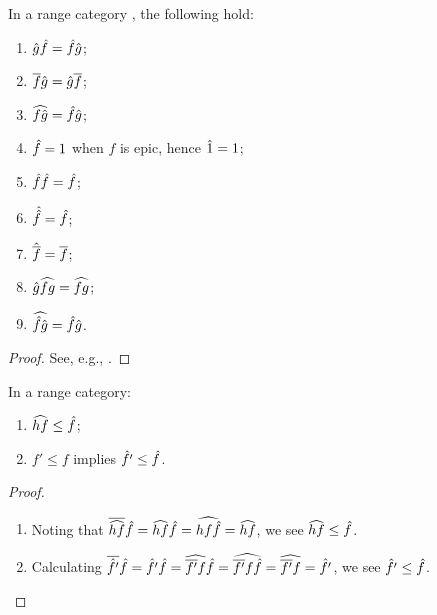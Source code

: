 \begin{lemma}\label{lem:basic_range_category_properties}
  In a range category \X, the following hold:
  \begin{multicols}{2}
    \begin{enumerate}[{(}i{)}]
      \item $\hat{g}\hat{f} = \hat{f}\hat{g}$;
      \item $\overline{f}\hat{g} = \hat{g}\overline{f}$;
      \item $\widehat{f\hat{g}} = \hat{f}\hat{g}$;
      \item $\hat{f} = 1$ when $f$ is epic, hence $\hat{1} = 1$;
      \item $\hat{f}\hat{f} = \hat{f}$;
      \item $\hat{\hat{f}} = \hat{f}$;
      \item $\hat{\overline{f}} = \overline{f}$;
      \item $\hat{g}\widehat{f g} = \widehat{f g}$;
      \item $\widehat{\hat{f}\hat{g}} = \hat{f}\hat{g}$.
    \end{enumerate}
  \end{multicols}
\end{lemma}
\begin{proof}
  See, e.g., \cite{guox:thesis}.
\end{proof}

\begin{lemma}\label{lem:ordering_of_restriction_and_range}
  In a range category:
  \begin{multicols}{2}
    \begin{enumerate}[{(}i{)}]
      \item  $\widehat{h f} \le \hat{f}$; \label{lemitem:ordering_1}
      \item $f' \le f$ implies $\hat{f'} \le \hat{f}$. \label{lemitem:ordering_2}
    \end{enumerate}
  \end{multicols}
\end{lemma}
\begin{proof}
  \prepprooflist
  \begin{enumerate}[{(}i{)}]
    \item Noting that $\overline{\widehat{hf}} \hat{f} = \widehat{hf} \hat{f}  = \widehat{hf \hat{f}} = \widehat{h f}$,
      we see $\widehat{h f} \le \hat{f}$.
    \item Calculating $\overline{\hat{f'}} \hat{f} = \hat{f'} \hat{f} = \widehat{\overline{f'} f} \hat{f} =
      \widehat{\overline{f'} f \hat{f}} = \widehat{\overline{f'} f} = \hat{f'}$, we see $\hat{f'} \le \hat{f}$.
  \end{enumerate}
\end{proof}


